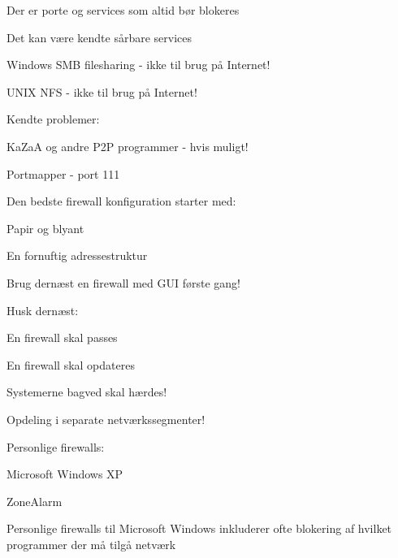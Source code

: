 
\begin{list1}
\item Der er porte og services som altid bør blokeres
\item Det kan være kendte sårbare services
\begin{list2}
\item Windows SMB filesharing - ikke til brug på Internet!
\item UNIX NFS - ikke til brug på Internet!
\end{list2}
\item Kendte problemer:
\begin{list2}
\item KaZaA og andre P2P programmer - hvis muligt!
\item Portmapper - port 111    
\end{list2}
\end{list1}


\begin{list1}
\item Den bedste firewall konfiguration starter med:
\begin{list2}
\item Papir og blyant
\item En fornuftig adressestruktur
\end{list2}
\item Brug dernæst en firewall med GUI første gang!
\item Husk dernæst:
\begin{list2}
\item En firewall skal passes
\item En firewall skal opdateres
\item Systemerne bagved skal hærdes!    
\end{list2}
\end{list1}




\centerline{Opdeling i separate netværkssegmenter!}


\begin{list1}
\item Personlige firewalls:  

\begin{list2}
\item Microsoft Windows XP
\item ZoneAlarm   
\end{list2}
\item Personlige firewalls til Microsoft Windows inkluderer ofte
blokering af hvilket programmer der må tilgå netværk
\end{list1}


